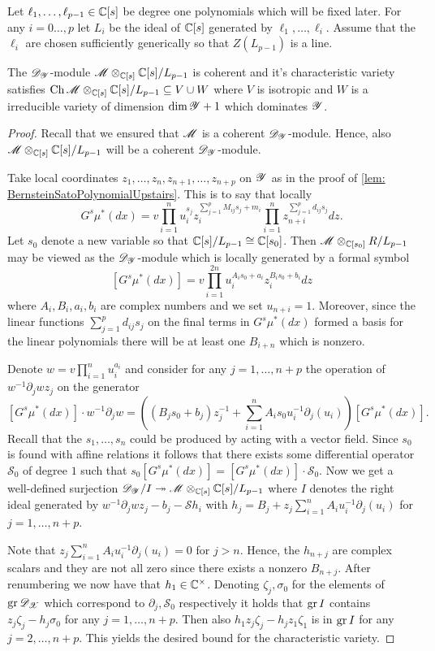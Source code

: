 Let $\ell_1,\ldots,\ell_{p-1}\in \mathbb{C}[s]$ be degree one polynomials which will be fixed later.
For any $i=0\ldots,p$ let $L_i$ be the ideal of $\mathbb{C}[s]$ generated by $\ell_1,\ldots,\ell_i$.
Assume that the $\ell_i$ are chosen sufficiently generically so that $Z(L_{p-1})$ is a line.
\begin{lemma}\label{lem: CharVarEstimateW}
  The $\mathscr{D}_{\mathscr{Y}}$-module $\mathscr{M}\otimes_{\mathbb{C}[s]}\mathbb{C}[s]/L_{p-1}$ is coherent and it's characteristic variety satisfies $\operatorname{Ch}\mathscr{M}\otimes_{\mathbb{C}[s]}\mathbb{C}[s]/L_{p-1} \subseteq V \cup W $ where $V$ is isotropic and $W$ is a irreducible variety of dimension $\dim \mathscr{Y} +1$ which dominates $\mathscr{Y}$.
\end{lemma}
\begin{proof}
  Recall that we ensured that $\mathscr{M}$ is a coherent $\mathscr{D}_{\mathscr{Y}}$-module.
  Hence, also $\mathscr{M}\otimes_{\mathbb{C}[s]}\mathbb{C}[s]/L_{p-1}$ will be a coherent $\mathscr{D}_{\mathscr{Y}}$-module.

  Take local coordinates $z_1,\ldots,z_n,z_{n+1},\ldots,z_{n+p}$ on $\mathscr{Y}$ as in the proof of \cref{lem: BernsteinSatoPolynomialUpstairs}.
  This is to say that locally
  $$G^s \mu^*(dx) = v \prod_{i=1}^nu_i^{s_j}z_i^{\sum_{j=1}^p M_{ij}s_j + m_i}\prod_{i=1}^n z_{n+i}^{\sum_{j=1}^p d_{ij}s_j} dz.$$
  Let $s_0$ denote a new variable so that $\mathbb{C}[s]/L_{p-1}\cong \mathbb{C}[s_0]$.
  Then $\mathscr{M}\otimes_{\mathbb{C}[s_0]}R/L_{p-1}$ may be viewed as the $\mathscr{D}_{\mathscr{Y}}$-module which is locally generated by a formal symbol
  $$[G^s \mu^*(dx)] =v \prod_{i=1}^{2n} u_i^{A_i s_0 + a_i}z_i^{B_i s_0 + b_i} dz $$
  where $A_i,B_i,a_i,b_i$ are complex numbers and we set $u_{n+i}=1$.
  Moreover, since the linear functions $\sum_{j=1}^p d_{ij}s_j$ on the final terms in $G^s\mu^*(dx)$ formed a basis for the linear polynomials there will be at least one $B_{i+n}$ which is nonzero.

  Denote $w = v\prod_{i=1}^n u_i^{a_i}$ and consider for any $j=1,\ldots,n+p$ the operation of $w^{-1}\partial_j wz_j$ on the generator
  $$[G^s \mu^*(dx)]\cdot w^{-1}\partial_j w =((B_j s_0 + b_j)z_j^{-1} + \sum_{i=1}^{n} A_i s_0 u_i^{-1}\partial_j(u_i) )[G^s \mu^*(dx)].$$
  Recall that the $s_1,\ldots,s_n$ could be produced by acting with a vector field.
  Since $s_0$ is found with affine relations it follows that there exists some differential operator $\mathcal{S}_0$ of degree $1$ such that $s_0 [G^s \mu^*(dx)] = [G^s \mu^*(dx)]\cdot \mathcal{S}_0$.
  Now we get a well-defined surjection $\mathscr{D}_{\mathscr{Y}}/I \twoheadrightarrow \mathscr{M}\otimes_{\mathbb{C}[s]}\mathbb{C}[s]/L_{p-1}$ where $I$ denotes the right ideal generated by $w^{-1}\partial_j wz_j - b_j - \mathcal{S} h_i$ with $h_j = B_j + z_j\sum_{i=1}^n A_iu_i^{-1}\partial_j(u_i)$ for $j=1,\ldots, n+p$.

  Note that $ z_j\sum_{i=1}^n A_iu_i^{-1}\partial_j(u_i) = 0$ for $j>n$.
  Hence, the $h_{n+j}$ are complex scalars and they are not all zero since there exists a nonzero $B_{n+j}$.
  After renumbering we now have that $h_1 \in \mathbb{C}^\times$.
  Denoting $\zeta_j, \sigma_0$ for the elements of $\operatorname{gr} \mathscr{D}_{\mathscr{X}}$ which correspond to $\partial_j, \mathcal{S}_0$ respectively it holds that $\operatorname{gr} I$ contains $z_j \zeta_j - h_j \sigma_0$ for any $j=1,\ldots, n+p$.
  Then also $h_1z_j \zeta_j - h_jz_1 \zeta_1$ is in $\operatorname{gr} I$ for any $j=2,\ldots, n+p$.
  This yields the desired bound for the characteristic variety.
\end{proof}
